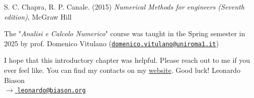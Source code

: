     \begin{thebibliography}{9}
         S. C. Chapra, R. P. Canale. (2015) \emph{Numerical Methods for engineers (Seventh edition)}, McGraw Hill 
    \end{thebibliography}
\endgroup

\begin{tcolorbox}[colback=Dandelion!25, colframe=Dandelion!50]
    \begin{center}
        The "\textit{Analisi e Calcolo Numerico}" course was taught in the Spring semester in 2025 by prof. Domenico Vitulano (\href{mailto:domenico.vitulano@uniroma1.it}{\texttt{domenico.vitulano@uniroma1.it}})
    \end{center}
\end{tcolorbox}

I hope that this introductory chapter was helpful. Please reach out to me if you ever feel like. You can find my contacts on my \href{https://www.leonardobiason.com}{website}. Good luck! \nl
Leonardo Biason\\
{\footnotesize \href{mailto:leonardo@biason.org}{$\to$ \texttt{leonardo@biason.org}}}